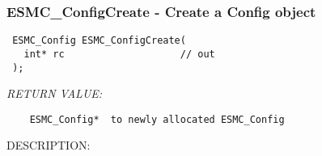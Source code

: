  
\setlength{\oldparskip}{\parskip}
\setlength{\parskip}{1.5ex}
\setlength{\oldparindent}{\parindent}
\setlength{\parindent}{0pt}
\setlength{\oldbaselineskip}{\baselineskip}
\setlength{\baselineskip}{11pt}
 
\def\bv{\begin{verbatim}}
\def\ev{\end{verbatim}}
\def\be{\begin{equation}}
\def\ee{\end{equation}}
\def\bea{\begin{eqnarray}}
\def\eea{\end{eqnarray}}
\def\bi{\begin{itemize}}
\def\ei{\end{itemize}}
\def\bn{\begin{enumerate}}
\def\en{\end{enumerate}}
\def\bd{\begin{description}}
\def\ed{\end{description}}
\def\({\left (}
\def\){\right )}
\def\[{\left [}
\def\]{\right ]}
\def\<{\left  \langle}
\def\>{\right \rangle}
\def\cI{{\cal I}}
\def\diag{\mathop{\rm diag}}
\def\tr{\mathop{\rm tr}}


 
\subsubsection [ESMC\_ConfigCreate] {ESMC\_ConfigCreate - Create a Config object}


  
\begin{verbatim} ESMC_Config ESMC_ConfigCreate(
   int* rc                    // out
 );\end{verbatim}{\em RETURN VALUE:}
\begin{verbatim}    ESMC_Config*  to newly allocated ESMC_Config\end{verbatim}
{\sf DESCRIPTION:\\ }


